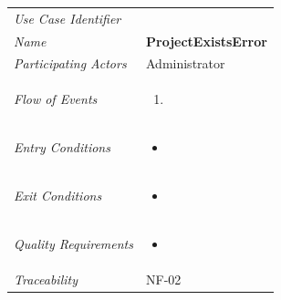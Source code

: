 \documentclass[12pt,letterpaper]{article}
\begin{document}
\begin{center}
	\begin{tabu} to 
		\toprule
		Use Case Identifier & \projectexistserror{} \\
		Name & {\bf ProjectExistsError} \\
		Participating Actors & Administrator \\
		Flow of Events & 
	    \begin{enumerate}[topsep=-1em,leftmargin=*]
		    \item 
		\end{enumerate} \\

		Entry Conditions &
		\begin{itemize}[topsep=-1em,leftmargin=*]
		    \item 
        \end{itemize} \\

		Exit Conditions &
		\begin{itemize}[topsep=-1em,leftmargin=*]
		    \item 
        \end{itemize} \\

		Quality Requirements &
		\begin{itemize}[topsep=-1em,leftmargin=*]
		    \item 
        \end{itemize} \\

		Traceability & NF-02 \\
		\toprule
	\end{tabu}
\end{center}
\end{document}
